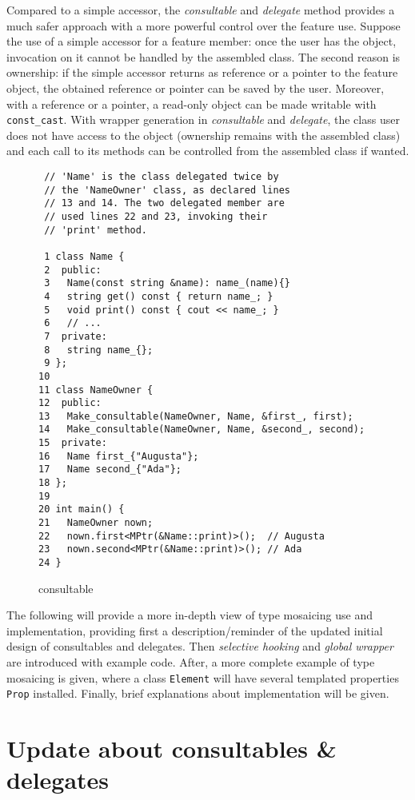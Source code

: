 \documentclass{article}
\begin{document}
Compared to a simple accessor, the \textit{consultable} and \textit{delegate} method provides a much safer approach with a more powerful control over the feature use. Suppose the use of a simple accessor for a feature member: once the user has the object, invocation on it cannot be handled by the assembled class. The second reason is ownership: if the simple accessor returns as reference or a pointer to the feature object, the obtained reference or pointer can be saved by the user. Moreover, with a reference or a pointer, a read-only object can be made writable with \texttt{const\_cast}. With wrapper generation in \textit{consultable} and \textit{delegate}, the class user does not have access to the object (ownership remains with the assembled class) and each call to its methods can be controlled from the assembled class if wanted.

\begin{figure}[ht]
{\small
\begin{lstlisting}
 // 'Name' is the class delegated twice by 
 // the 'NameOwner' class, as declared lines 
 // 13 and 14. The two delegated member are 
 // used lines 22 and 23, invoking their 
 // 'print' method.

 1 class Name {
 2  public:
 3   Name(const string &name): name_(name){}
 4   string get() const { return name_; }
 5   void print() const { cout << name_; }
 6   // ...
 7  private:
 8   string name_{};
 9 };
10 
11 class NameOwner {
12  public:
13   Make_consultable(NameOwner, Name, &first_, first);
14   Make_consultable(NameOwner, Name, &second_, second);
15  private:
16   Name first_{"Augusta"};
17   Name second_{"Ada"};
18 };
19 
20 int main() {
21   NameOwner nown;
22   nown.first<MPtr(&Name::print)>();  // Augusta
23   nown.second<MPtr(&Name::print)>(); // Ada
24 }
\end{lstlisting}}
\cprotect\caption{consultable}
\label{example:basic}
\end{figure}

The following will provide a more in-depth view of type mosaicing use and implementation, providing first a description/reminder of the updated initial design of consultables and delegates. Then \textit{selective hooking} and \textit{global wrapper} are introduced with example code. After, a more complete example of type mosaicing is given, where a class \texttt{Element} will have several templated properties \texttt{Prop} installed. Finally, brief explanations about implementation will be given.         


\section{Update about consultables \& delegates}
\end{document}
